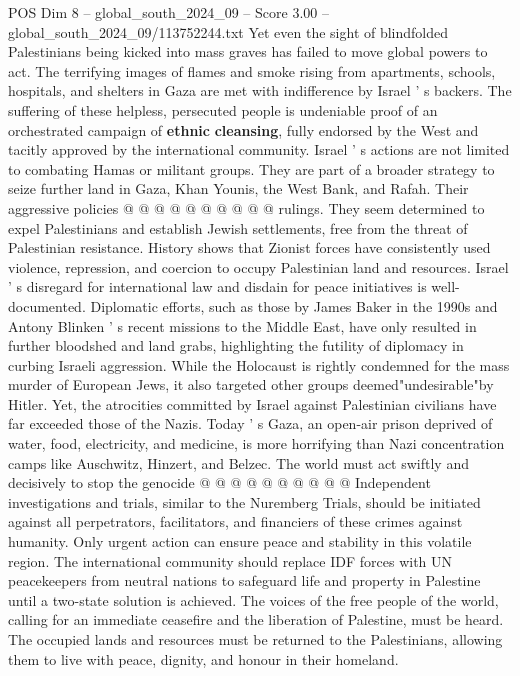 \begin{textsample}{POS Dim 8 – global\_south\_2024\_09 – Score 3.00 – global\_south\_2024\_09/113752244.txt}
Yet even the sight of blindfolded Palestinians being kicked into mass graves has failed to move global powers to act.
The terrifying images of flames and smoke rising from apartments, schools, hospitals, and shelters in Gaza are met with indifference by Israel ' s backers.
The suffering of these helpless, persecuted people is undeniable proof of an orchestrated campaign of \textbf{ethnic} \textbf{cleansing}, fully endorsed by the West and tacitly approved by the international community.
Israel ' s actions are not limited to combating Hamas or militant groups.
They are part of a broader strategy to seize further land in Gaza, Khan Younis, the West Bank, and Rafah.
Their aggressive policies @ @ @ @ @ @ @ @ @ @ rulings.
They seem determined to expel Palestinians and establish Jewish settlements, free from the threat of Palestinian resistance.
History shows that Zionist forces have consistently used violence, repression, and coercion to occupy Palestinian land and resources.
Israel ' s disregard for international law and disdain for peace initiatives is well-documented.
Diplomatic efforts, such as those by James Baker in the 1990s and Antony Blinken ' s recent missions to the Middle East, have only resulted in further bloodshed and land grabs, highlighting the futility of diplomacy in curbing Israeli aggression.
While the Holocaust is rightly condemned for the mass murder of European Jews, it also targeted other groups deemed"undesirable"by Hitler.
Yet, the atrocities committed by Israel against Palestinian civilians have far exceeded those of the Nazis.
Today ' s Gaza, an open-air prison deprived of water, food, electricity, and medicine, is more horrifying than Nazi concentration camps like Auschwitz, Hinzert, and Belzec.
The world must act swiftly and decisively to stop the genocide @ @ @ @ @ @ @ @ @ @ Independent investigations and trials, similar to the Nuremberg Trials, should be initiated against all perpetrators, facilitators, and financiers of these crimes against humanity.
Only urgent action can ensure peace and stability in this volatile region.
The international community should replace IDF forces with UN peacekeepers from neutral nations to safeguard life and property in Palestine until a two-state solution is achieved.
The voices of the free people of the world, calling for an immediate ceasefire and the liberation of Palestine, must be heard.
The occupied lands and resources must be returned to the Palestinians, allowing them to live with peace, dignity, and honour in their homeland.

\end{textsample}
